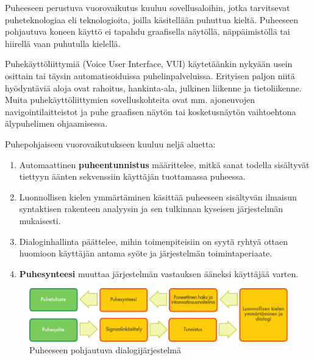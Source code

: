 \begin{multicols}{2}
Puheeseen perustuva vuorovaikutus kuuluu sovellusaloihin, jotka tarvitsevat puheteknologiaa eli teknologioita, joilla käsitellään puhuttua kieltä. Puheeseen pohjautuva koneen käyttö ei tapahdu graafisella näytöllä, näppäimistöllä tai hiirellä vaan puhutulla kielellä.


Puhekäyttöliittymiä (Voice User Interface, VUI) käytetäänkin nykyään usein osittain tai täysin automatisoiduissa puhelinpalveluissa. Erityisen paljon niitä hyödyntäviä aloja ovat rahoitus, hankinta-ala, julkinen liikenne ja tietoliikenne. Muita puhekäyttöliittymien sovelluskohteita ovat mm. ajoneuvojen navigointilaitteistot ja puhe graafisen näytön tai kosketusnäytön vaihtoehtona älypuhelimen ohjaamisessa.

Puhepohjaiseen vuorovaikutukseen kuuluu neljä aluetta:

\begin{enumerate}
\item Automaattinen \textbf{puheentunnistus} määrittelee, mitkä sanat
  todella sisältyvät tiettyyn äänten sekvenssiin käyttäjän tuottamassa
  puheessa.
\item Luonnollisen kielen ymmärtäminen käsittää puheeseen sisältyvän
  ilmaisun syntaktisen rakenteen analyysin ja sen tulkinnan kyseisen
  järjestelmän mukaisesti.
\item Dialoginhallinta päättelee, mihin toimenpiteisiin on syytä
  ryhtyä ottaen huomioon käyttäjän antama syöte ja järjestelmän
  toimintaperiaate.
\item \textbf{Puhesynteesi} muuttaa järjestelmän vastauksen ääneksi
  käyttäjää varten.
\end{enumerate}

\begin{figure}[htb]
  \center  \includegraphics[width=\textwidth]{../_media/finnish/simple_speech-based_dialogue_architecture}
  \center
    \caption{Puheeseen pohjautuva dialogijärjestelmä}
    \label{fig:dialoguearch-fin}
  \end{figure}


\end{multicols}

